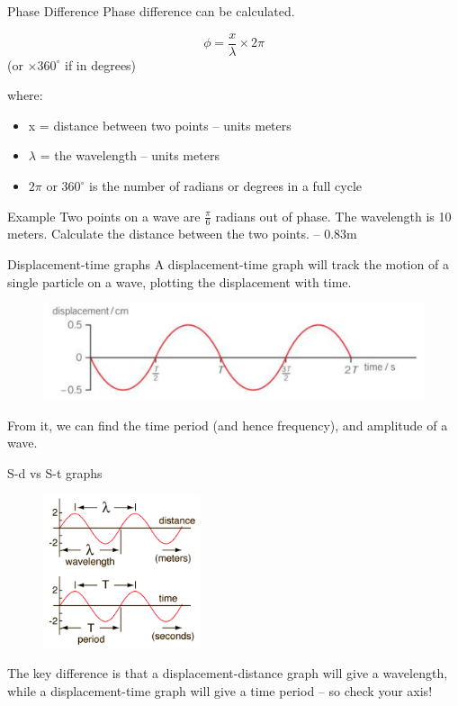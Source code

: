 \documentclass[../Main.tex]{subfiles}
\begin{document}
\begin{frame}{Phase Difference}
    Phase difference can be calculated.
    
    \begin{equation*}
        \phi = \frac{x}{\lambda} \times 2\pi 
    \end{equation*} (or $\times 360^\circ$ if in degrees)
    
    where: \begin{itemize}
        \item x = distance between two points -- units meters
        \item $\lambda$ = the wavelength -- units meters
        \item $2\pi$ or $360^\circ$ is the number of radians or degrees in a full cycle
    \end{itemize}
    \pause
    \begin{exampleblock}{Example}
    Two points on a wave are $\frac{\pi}{6}$ radians out of phase. The wavelength is 10 meters. Calculate the distance between the two points. \pause
    -- 0.83m
    \end{exampleblock}
\end{frame}

\begin{frame}{Displacement-time graphs}
    A displacement-time graph will track the motion of a single particle on a wave, plotting the displacement with time. 
    
    \begin{figure}
        \centering
        \includegraphics[width=\textwidth]{Waves_Images/displacement_time_graph.png}
    \end{figure}
    
    From it, we can find the time period (and hence frequency), and amplitude of a wave.
\end{frame}

\begin{frame}{S-d vs S-t graphs}
    \begin{figure}
        \centering
        \includegraphics[height=4.5cm]{Waves_Images/sdst_comparison.png}
    \end{figure}
    The key difference is that a displacement-distance graph will give a wavelength, while a displacement-time graph will give a time period -- so check your axis!
\end{frame}
\end{document}
